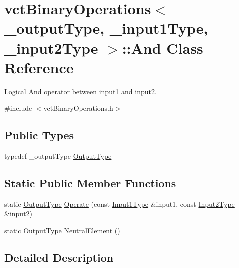 \hypertarget{classvct_binary_operations_1_1_and}{\section{vct\-Binary\-Operations$<$ \-\_\-output\-Type, \-\_\-input1\-Type, \-\_\-input2\-Type $>$\-:\-:And Class Reference}
\label{classvct_binary_operations_1_1_and}
}


Logical \hyperlink{classvct_binary_operations_1_1_and}{And} operator between input1 and input2.  




{\ttfamily \#include $<$vct\-Binary\-Operations.\-h$>$}

\subsection*{Public Types}
\begin{DoxyCompactItemize}
\item 
typedef \-\_\-output\-Type \hyperlink{classvct_binary_operations_1_1_and_a266e94b9b9630c9e1f7527e5083c1384}{Output\-Type}
\end{DoxyCompactItemize}
\subsection*{Static Public Member Functions}
\begin{DoxyCompactItemize}
\item 
static \hyperlink{classvct_binary_operations_1_1_and_a266e94b9b9630c9e1f7527e5083c1384}{Output\-Type} \hyperlink{classvct_binary_operations_1_1_and_a30145d7977429d65ca1706d876d528ec}{Operate} (const \hyperlink{classvct_binary_operations_a5e56a66a012d6a28c539a08a0021c45e}{Input1\-Type} \&input1, const \hyperlink{classvct_binary_operations_a929119af557a04a16b4d854981e49e1b}{Input2\-Type} \&input2)
\item 
static \hyperlink{classvct_binary_operations_1_1_and_a266e94b9b9630c9e1f7527e5083c1384}{Output\-Type} \hyperlink{classvct_binary_operations_1_1_and_a6f5b7a04f80a8501d5423983957eecb7}{Neutral\-Element} ()
\end{DoxyCompactItemize}


\subsection{Detailed Description}
